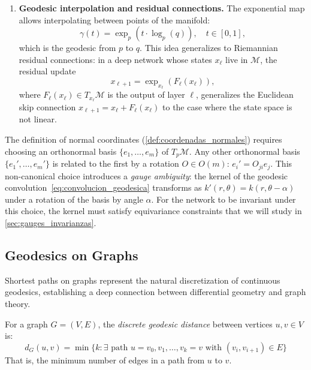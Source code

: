 \begin{remark}
\begin{enumerate}
	\item \textbf{Geodesic interpolation and residual connections.} The exponential map allows interpolating between points of the manifold:
	\[
	\gamma(t) = \exp_p(t \cdot \log_p(q)), \quad t \in [0,1],
	\]
	which is the geodesic from $p$ to $q$. This idea generalizes to Riemannian residual connections: in a deep network whose states $x_\ell$ live in $\mathcal{M}$, the residual update
	\begin{equation}\label{eq:residual_riemanniana}
	x_{\ell+1} = \exp_{x_\ell}(F_\ell(x_\ell)),
	\end{equation}
	where $F_\ell(x_\ell) \in T_{x_\ell}\mathcal{M}$ is the output of layer $\ell$, generalizes the Euclidean skip connection $x_{\ell+1} = x_\ell + F_\ell(x_\ell)$ to the case where the state space is not linear.
\end{enumerate}
\end{remark}

\begin{remark}\label{rem:ambiguedad_gauge_normales}
The definition of normal coordinates (\autoref{def:coordenadas_normales}) requires choosing an orthonormal basis $\{e_1, \ldots, e_m\}$ of $T_p\mathcal{M}$. Any other orthonormal basis $\{e_1', \ldots, e_m'\}$ is related to the first by a rotation $O \in O(m)$: $e_i' = O_{ji} e_j$. This non-canonical choice introduces a \textit{gauge ambiguity}: the kernel of the geodesic convolution~\eqref{eq:convolucion_geodesica} transforms as $k'(r, \theta) = k(r, \theta - \alpha)$ under a rotation of the basis by angle $\alpha$. For the network to be invariant under this choice, the kernel must satisfy equivariance constraints that we will study in \autoref{sec:gauges_invarianzas}.
\end{remark}

\subsection{Geodesics on Graphs}\label{subsec:geodesicas_grafos}

Shortest paths on graphs represent the natural discretization of continuous geodesics, establishing a deep connection between differential geometry and graph theory.

\begin{definition}\label{def:distancia_geodesica_grafo}
For a graph $G = (V, E)$, the \textit{discrete geodesic distance} between vertices $u, v \in V$ is:
\[
d_G(u,v) = \min\{k : \exists \text{ path } u = v_0, v_1, \ldots, v_k = v \text{ with } (v_i, v_{i+1}) \in E\}
\]
That is, the minimum number of edges in a path from $u$ to $v$.
\end{definition}

